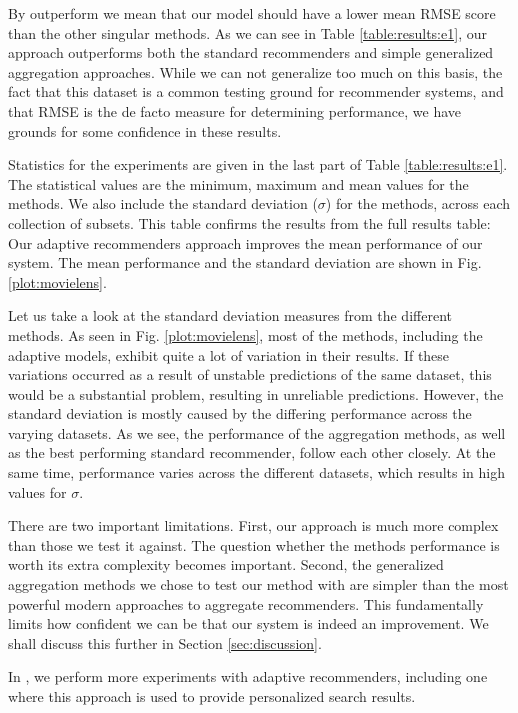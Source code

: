 By outperform we mean that our model should have a lower
mean RMSE score than the other singular methods. As we can see in Table \ref{table:results:e1},
our approach outperforms both the standard recommenders
and simple generalized aggregation approaches.
While we can not generalize too much on this basis, 
the fact that this dataset is a common testing ground for recommender systems,
and that RMSE is the de facto measure for determining performance,
we have grounds for some confidence in these results.



Statistics for the experiments are given in the last
part of Table \ref{table:results:e1}. 
The statistical values are the minimum, maximum and mean values
for the methods. We also include
the standard deviation ($\sigma$) for the methods,
across each collection of subsets.
This table confirms the results from the full results table:
Our adaptive recommenders approach improves the mean performance
of our system.
The mean performance and the standard deviation
are shown in Fig. \ref{plot:movielens}.


%

Let us take a look at the standard deviation measures from the different methods.
As seen in Fig. \ref{plot:movielens}, 
most of the methods, including the adaptive models,
exhibit quite a lot of variation in their results.
If these variations occurred as a result of unstable
predictions of the same dataset, this would be a substantial problem,
resulting in unreliable predictions.
However, the standard deviation is mostly caused by the differing
performance across the varying datasets.
As we see, the performance of the aggregation methods,
as well as the best performing standard recommender,
follow each other closely. At the same time,
performance varies across the different datasets,
which results in high values for $\sigma$.

There are two important limitations.
First, our approach is much more complex than those we test it against.
The question whether the methods performance is worth its extra complexity becomes important.
Second, the generalized aggregation methods we chose to test our method with
are simpler than the most powerful modern approaches to aggregate recommenders.
This fundamentally limits how confident we can be that our system
is indeed an improvement.
We shall discuss this further in Section \ref{sec:discussion}.

In \cite{Bjorkoy2011}, we perform more experiments with adaptive recommenders,
including one where this approach is used to provide personalized search results.


